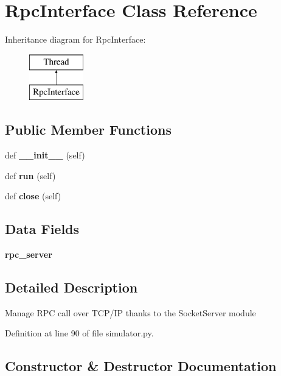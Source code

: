\section{Rpc\+Interface Class Reference}
\label{classprotolibs_1_1modbus__tk_1_1simulator_1_1_rpc_interface}
Inheritance diagram for Rpc\+Interface\+:\begin{figure}[H]
\begin{center}
\leavevmode
\includegraphics[height=2.000000cm]{classprotolibs_1_1modbus__tk_1_1simulator_1_1_rpc_interface}
\end{center}
\end{figure}
\subsection*{Public Member Functions}
\begin{DoxyCompactItemize}
\item 
def {\bf \+\_\+\+\_\+init\+\_\+\+\_\+} (self)
\item 
def {\bf run} (self)
\item 
def {\bf close} (self)
\end{DoxyCompactItemize}
\subsection*{Data Fields}
\begin{DoxyCompactItemize}
\item 
{\bf rpc\+\_\+server}
\end{DoxyCompactItemize}


\subsection{Detailed Description}
\begin{DoxyVerb}Manage RPC call over TCP/IP thanks to the SocketServer module\end{DoxyVerb}
 

Definition at line 90 of file simulator.\+py.



\subsection{Constructor \& Destructor Documentation}
